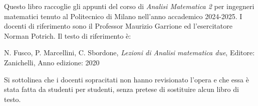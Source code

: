 Questo libro raccoglie gli appunti del corso di \emph{Analisi Matematica 2} per ingegneri matematici tenuto al Politecnico di Milano nell'anno accademico 2024-2025. I docenti di riferimento sono il Professor Maurizio Garrione ed l'esercitatore Norman Potrich.
Il testo di riferimento è:

N. Fusco, P. Marcellini, C. Sbordone, \textit{Lezioni di Analisi matematica due}, Editore: Zanichelli, Anno edizione: 2020


Si sottolinea che i docenti sopracitati non hanno revisionato l'opera e che essa è stata fatta da studenti per studenti, senza pretese di sostituire alcun libro di testo.
